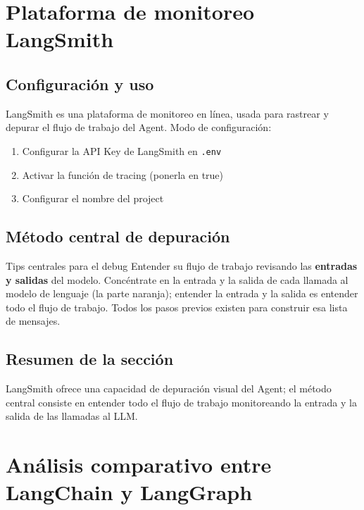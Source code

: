 \documentclass[a4paper]{article}
\begin{document}
\section{Plataforma de monitoreo LangSmith}

\subsection{Configuración y uso}

LangSmith es una plataforma de monitoreo en línea, usada para rastrear y depurar el flujo de trabajo del Agent. Modo de configuración:
\begin{enumerate}
    \item Configurar la API Key de LangSmith en \texttt{.env}
    \item Activar la función de tracing (ponerla en true)
    \item Configurar el nombre del project
\end{enumerate}

\subsection{Método central de depuración}

\begin{importantbox}{Tips centrales para el debug}
Entender su flujo de trabajo revisando las \textbf{entradas y salidas} del modelo. Concéntrate en la entrada y la salida de cada llamada al modelo de lenguaje (la parte naranja); entender la entrada y la salida es entender todo el flujo de trabajo. Todos los pasos previos existen para construir esa lista de mensajes.
\end{importantbox}

\subsection{Resumen de la sección}
LangSmith ofrece una capacidad de depuración visual del Agent; el método central consiste en entender todo el flujo de trabajo monitoreando la entrada y la salida de las llamadas al LLM.

\section{Análisis comparativo entre LangChain y LangGraph}
\end{document}
